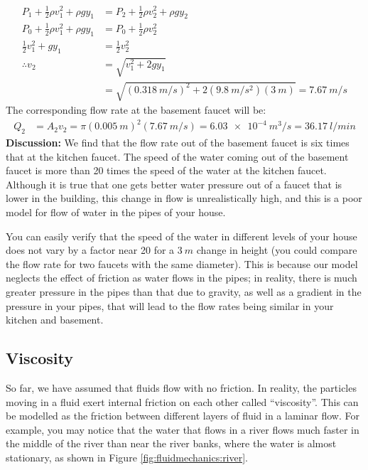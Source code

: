 {{\begin{example}
\begin{align*}
P_1 +\frac{1}{2}\rho v_1^2+ \rho g y_1&= P_2 + \frac{1}{2}\rho v_2^2 + \rho g y_2\\
P_0+\frac{1}{2}\rho v_1^2+ \rho g y_1&= P_0 + \frac{1}{2}\rho v_2^2 \\
\frac{1}{2} v_1^2+  gy_1&=  \frac{1}{2} v_2^2 \\
\therefore v_2 &= \sqrt{v_1^2 + 2gy_1}\\
&=\sqrt{(\SI{0.318}{m/s})^2+2(\SI{9.8}{m/s^2})(\SI{3}{m})}=\SI{7.67}{m/s}
\end{align*}
The corresponding flow rate at the basement faucet will be:
\begin{align*}
Q_2 &= A_2 v_2 = \pi(\SI{0.005}{m})^2(\SI{7.67}{m/s})=\SI{6.03e-4}{m^3/s}=\SI{36.17}{l/min}
\end{align*}
\textbf{Discussion:} We find that the flow rate out of the basement faucet is six times that at the kitchen faucet. The speed of the water coming out of the basement faucet is more than 20 times the speed of the water at the kitchen faucet. Although it is true that one gets better water pressure out of a faucet that is lower in the building, this change in flow is unrealistically high, and this is a poor model for flow of water in the pipes of your house.

You can easily verify that the speed of the water in different levels of your house does not vary by a factor near 20 for a $\SI{3}{m}$ change in height (you could compare the flow rate for two faucets with the same diameter). This is because our model neglects the effect of friction as water flows in the pipes; in reality, there is much greater pressure in the pipes than that due to gravity, as well as a gradient in the pressure in your pipes, that will lead to the flow rates being similar in your kitchen and basement.
\end{example}

\subsection{Viscosity}
So far, we have assumed that fluids flow with no friction. In reality, the particles moving in  a fluid exert internal friction on each other called ``viscosity''. This can be modelled as the friction between different layers of fluid in a laminar flow. For example, you may notice that the water that flows in a river flows much faster in the middle of the river than near the river banks, where the water is almost stationary, as shown in Figure \ref{fig:fluidmechanics:river}. 

}}
